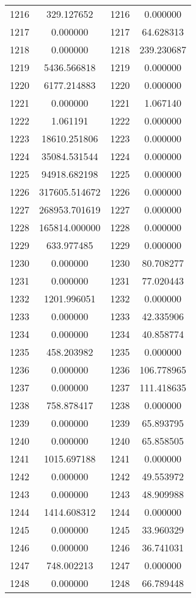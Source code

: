 \documentclass[12pt]{article}
\begin{document}
\begin{longtable}{@{}cccc@{}}
1216 & 329.127652 & 1216 & 0.000000 \\
1217 & 0.000000 & 1217 & 64.628313 \\
1218 & 0.000000 & 1218 & 239.230687 \\
1219 & 5436.566818 & 1219 & 0.000000 \\
1220 & 6177.214883 & 1220 & 0.000000 \\
1221 & 0.000000 & 1221 & 1.067140 \\
1222 & 1.061191 & 1222 & 0.000000 \\
1223 & 18610.251806 & 1223 & 0.000000 \\
1224 & 35084.531544 & 1224 & 0.000000 \\
1225 & 94918.682198 & 1225 & 0.000000 \\
1226 & 317605.514672 & 1226 & 0.000000 \\
1227 & 268953.701619 & 1227 & 0.000000 \\
1228 & 165814.000000 & 1228 & 0.000000 \\
1229 & 633.977485 & 1229 & 0.000000 \\
1230 & 0.000000 & 1230 & 80.708277 \\
1231 & 0.000000 & 1231 & 77.020443 \\
1232 & 1201.996051 & 1232 & 0.000000 \\
1233 & 0.000000 & 1233 & 42.335906 \\
1234 & 0.000000 & 1234 & 40.858774 \\
1235 & 458.203982 & 1235 & 0.000000 \\
1236 & 0.000000 & 1236 & 106.778965 \\
1237 & 0.000000 & 1237 & 111.418635 \\
1238 & 758.878417 & 1238 & 0.000000 \\
1239 & 0.000000 & 1239 & 65.893795 \\
1240 & 0.000000 & 1240 & 65.858505 \\
1241 & 1015.697188 & 1241 & 0.000000 \\
1242 & 0.000000 & 1242 & 49.553972 \\
1243 & 0.000000 & 1243 & 48.909988 \\
1244 & 1414.608312 & 1244 & 0.000000 \\
1245 & 0.000000 & 1245 & 33.960329 \\
1246 & 0.000000 & 1246 & 36.741031 \\
1247 & 748.002213 & 1247 & 0.000000 \\
1248 & 0.000000 & 1248 & 66.789448 \\

\end{longtable}
\end{document}
